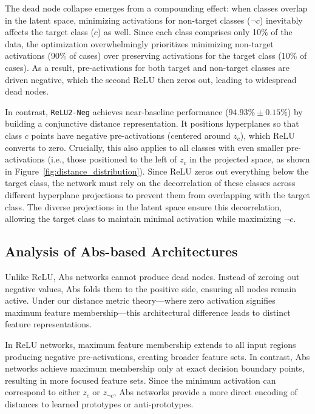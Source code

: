 The dead node collapse emerges from a compounding effect: when classes overlap in the latent space, minimizing activations for non-target classes ($\neg c$) inevitably affects the target class ($c$) as well. Since each class comprises only 10\% of the data, the optimization overwhelmingly prioritizes minimizing non-target activations (90\% of cases) over preserving activations for the target class (10\% of cases). As a result, pre-activations for both target and non-target classes are driven negative, which the second ReLU then zeros out, leading to widespread dead nodes.

In contrast, \texttt{ReLU2-Neg} achieves near-baseline performance ($94.93\% \pm 0.15\%$) by building a conjunctive distance representation. It positions hyperplanes so that class $c$ points have negative pre-activations (centered around $z_c$), which ReLU converts to zero. Crucially, this also applies to all classes with even smaller pre-activations (i.e., those positioned to the left of $z_c$ in the projected space, as shown in Figure~\ref{fig:distance_distribution}). Since ReLU zeros out everything below the target class, the network must rely on the decorrelation of these classes across different hyperplane projections to prevent them from overlapping with the target class. The diverse projections in the latent space \cite{bengio2013representation, cogswell2016decorrelating} ensure this decorrelation, allowing the target class to maintain minimal activation while maximizing $\neg c$.

\subsection{Analysis of Abs-based Architectures}

Unlike ReLU, Abs networks cannot produce dead nodes. Instead of zeroing out negative values, Abs folds them to the positive side, ensuring all nodes remain active. Under our distance metric theory—where zero activation signifies maximum feature membership—this architectural difference leads to distinct feature representations. 

In ReLU networks, maximum feature membership extends to all input regions producing negative pre-activations, creating broader feature sets. In contrast, Abs networks achieve maximum membership only at exact decision boundary points, resulting in more focused feature sets. Since the minimum activation can correspond to either $z_c$ or $z_{\neg c}$, Abs networks provide a more direct encoding of distances to learned prototypes or anti-prototypes.

